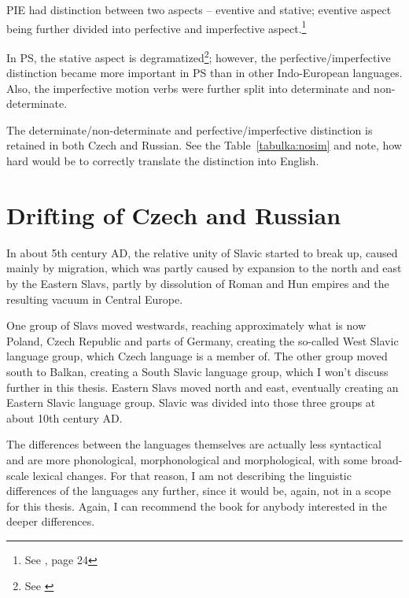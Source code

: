 PIE had distinction between two aspects -- eventive and stative; eventive aspect being further divided into perfective and imperfective aspect.\footnote{See \cite{ringe2008proto}, page 24}

In PS, the stative aspect is degramatized\footnote{See \cite{andersen2013origin}}; however, the perfective/imperfective distinction became more important in PS than in other Indo-European languages. Also, the imperfective motion verbs were further split into determinate and non-determinate.

The determinate/non-determinate and perfective/imperfective distinction is retained in both Czech and Russian. See the Table~\ref{tabulka:nosim} and note, how hard would be to correctly translate the distinction into English.


\section{Drifting of Czech and Russian}
In about 5th century AD, the relative unity of Slavic started to break up, caused mainly by migration, which was partly caused by expansion to the north and east by the Eastern Slavs, partly by dissolution of Roman and Hun empires and the resulting vacuum in Central Europe.

One group of Slavs moved westwards, reaching approximately what is now Poland, Czech Republic and parts of Germany, creating the so-called West Slavic language group, which Czech language is a member of. The other group moved south to Balkan, creating a South Slavic language group, which I won't discuss further in this thesis. Eastern Slavs moved north and east, eventually creating an Eastern Slavic language group. Slavic was divided into those three groups at about 10th century AD.

The differences between the languages themselves are actually less syntactical and are more phonological, morphonological and morphological, with some broad-scale lexical changes. For that reason, I am not describing the linguistic differences of the languages any further, since it would be, again, not in a scope for this thesis. Again, I can recommend the book \cite{sussex2011slavic} for anybody interested in the deeper differences.


\begin{comment}



I will now focus on the changes Czech and Russian went trough, to better illustrate their similarities and differences. As in the previous section, I will ignore the phonological changes and focus on morphology and lexis.

And again, this section is only scratching the surface of all the changes and differences. For much further discussion, see very thorough \cite{sussex2011slavic}.

\end{comment}

